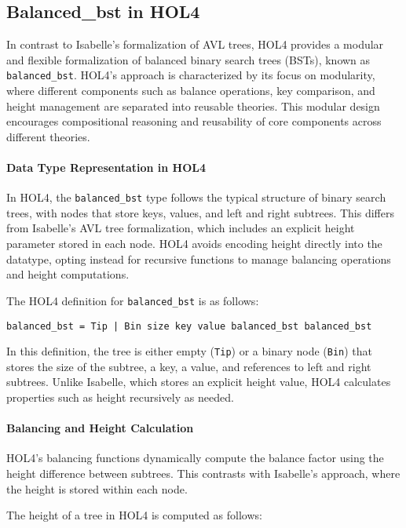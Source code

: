 \documentclass[12pt]{article}
\begin{document}
\subsection{Balanced\_bst in HOL4}

In contrast to Isabelle’s formalization of AVL trees, HOL4 \cite{HOLBalancedBST} provides a modular and flexible formalization of balanced binary search trees (BSTs), known as \texttt{balanced\_bst}. HOL4's approach is characterized by its focus on modularity, where different components such as balance operations, key comparison, and height management are separated into reusable theories. This modular design encourages compositional reasoning and reusability of core components across different theories.

\paragraph{Data Type Representation in HOL4}
In HOL4, the \texttt{balanced\_bst} type follows the typical structure of binary search trees, with nodes that store keys, values, and left and right subtrees. This differs from Isabelle's AVL tree formalization, which includes an explicit height parameter stored in each node. HOL4 avoids encoding height directly into the datatype, opting instead for recursive functions to manage balancing operations and height computations.

The HOL4 definition for \texttt{balanced\_bst} is as follows:

\begin{verbatim}
balanced_bst = Tip | Bin size key value balanced_bst balanced_bst
\end{verbatim}

In this definition, the tree is either empty (\texttt{Tip}) or a binary node (\texttt{Bin}) that stores the size of the subtree, a key, a value, and references to left and right subtrees. Unlike Isabelle, which stores an explicit height value, HOL4 calculates properties such as height recursively as needed.

\paragraph{Balancing and Height Calculation}
HOL4’s balancing functions dynamically compute the balance factor using the height difference between subtrees. This contrasts with Isabelle’s approach, where the height is stored within each node.

The height of a tree in HOL4 is computed as follows:
\end{document}
